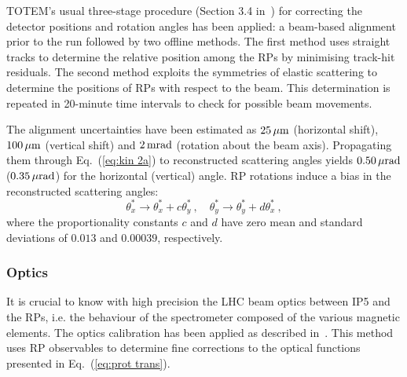 TOTEM's usual three-stage procedure (Section 3.4 in~\cite{totem-ijmp}) for correcting the detector positions and rotation angles has been applied: a beam-based alignment prior to the run followed by two offline methods. The first method uses straight tracks to determine the relative position among the RPs by minimising track-hit residuals. The second method exploits the symmetries of elastic scattering to determine the positions of RPs with respect to the beam. This determination is repeated in 20-minute time intervals to check for possible beam movements.

The alignment uncertainties have been estimated as $25\,{\rm \mu m}$ (horizontal shift), $100\,{\rm \mu m}$ (vertical shift) and $2\,{\rm m rad}$ (rotation about the beam axis). Propagating them through Eq.~(\ref{eq:kin 2a}) to reconstructed scattering angles yields $0.50\,{\rm \mu rad}$ ($0.35\,{\rm \mu rad}$) for the horizontal (vertical) angle. RP rotations induce a bias in the reconstructed scattering angles:
\begin{equation}
\label{eq:alig rot bias}
	\theta_x^* \rightarrow \theta_x^* + c \theta_y^*\ ,\quad
	\theta_y^* \rightarrow \theta_y^* + d \theta_x^*\ ,
\end{equation}
where the proportionality constants $c$ and $d$ have zero mean and standard deviations of $0.013$ and $0.00039$, respectively.




\subsubsection{Optics}
\label{sec:optics}

It is crucial to know with high precision the LHC beam optics between IP5 and the RPs, i.e. the behaviour of the spectrometer composed of the various magnetic elements. The optics calibration has been applied as described in~\cite{totem-optics}. This method uses RP observables to determine fine corrections to the optical functions presented in Eq.~(\ref{eq:prot trans}).

